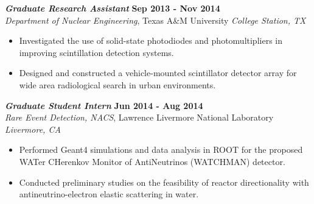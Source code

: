 {\sl\bf Graduate Research Assistant} \hfill {\bf Sep 2013 - Nov 2014} \\
{\sl Department of Nuclear Engineering}, Texas A\&M University \hfill {\sl College Station, TX} \\[-2.8ex]
\vspace{2pt}
\begin{itemize}[leftmargin=4ex] \itemsep -2pt
\item Investigated the use of solid-state photodiodes and photomultipliers in improving scintillation detection systems.
\item Designed and constructed a vehicle-mounted scintillator detector array for wide area radiological search in urban environments.
\end{itemize} 

{\sl\bf Graduate Student Intern} \hfill {\bf Jun 2014 - Aug 2014} \\
{\sl Rare Event Detection, NACS}, Lawrence Livermore National Laboratory \hfill {\sl Livermore, CA} \\[-2.8ex]
\vspace{2pt}
\begin{itemize}[leftmargin=4ex] \itemsep -2pt
\item Performed Geant4 simulations and data analysis in ROOT for the proposed WATer CHerenkov Monitor of AntiNeutrinos (WATCHMAN) detector.
\item Conducted preliminary studies on the feasibility of reactor directionality with antineutrino-electron elastic scattering in water.
\end{itemize}


